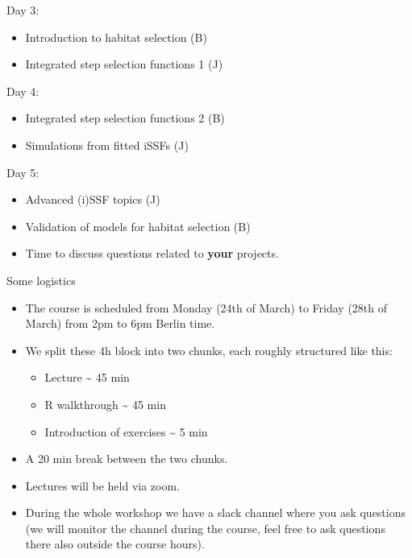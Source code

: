 \documentclass[ignorenonframetext,,t]{beamer}
\let\oldtextbf\textbf
\renewcommand{\textbf}[1]{\textcolor{spamwell}{\oldtextbf{#1}}}
\providecommand{\tightlist}{%
\setlength{\itemsep}{0pt}\setlength{\parskip}{0pt}}
\providecommand{\tightlist}{%
\setlength{\itemsep}{0pt}\setlength{\parskip}{0pt}}
\renewcommand{\tightlist}{\setlength{\itemsep}{1.4ex}\setlength{\parskip}{0pt}}
\begin{document}
\begin{frame}
\begin{block}{Day 3:}
\label{day-3}
\begin{itemize}
\tightlist
\item
  Introduction to habitat selection (B)
\item
  Integrated step selection functions 1 (J)
\end{itemize}
\end{block}

\begin{block}{Day 4:}
\label{day-4}
\begin{itemize}
\tightlist
\item
  Integrated step selection functions 2 (B)
\item
  Simulations from fitted iSSFs (J)
\end{itemize}
\end{block}

\begin{block}{Day 5:}
\label{day-5}
\begin{itemize}
\tightlist
\item
  Advanced (i)SSF topics (J)
\item
  Validation of models for habitat selection (B)
\item
  Time to discuss questions related to \textbf{your} projects.
\end{itemize}
\end{block}
\end{frame}

\begin{frame}
\begin{block}{Some logistics}
\label{some-logistics}
\begin{itemize}
\item
  The course is scheduled from Monday (24th of March) to Friday (28th of
  March) from 2pm to 6pm Berlin time.
\item
  We split these 4h block into two chunks, each roughly structured like
  this:

  \begin{itemize}
  \tightlist
  \item
    Lecture \textasciitilde{} 45 min
  \item
    R walkthrough \textasciitilde{} 45 min
  \item
    Introduction of exercises \textasciitilde{} 5 min
  \end{itemize}
\item
  A 20 min break between the two chunks.
\item
  Lectures will be held via zoom.
\item
  During the whole workshop we have a slack channel where you ask
  questions (we will monitor the channel during the course, feel free to
  ask questions there also outside the course hours).
\end{itemize}
\end{block}
\end{frame}
\end{document}

